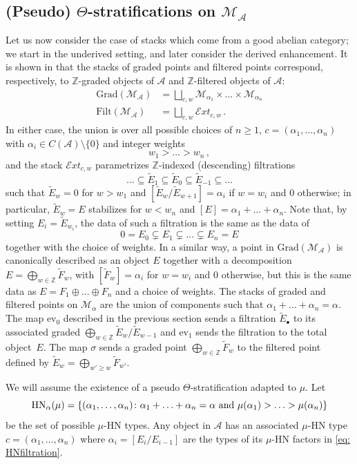 \documentclass[12pt]{amsart}
\theoremstyle{definition}
\newcommand{\BZ}{{\mathbb{Z}}}
\newcommand{\CA}{{\mathcal A}}
\newcommand{\CM}{{\mathcal M}}
\newcommand{\1}{\mathbf 1}
\renewcommand{\ev}{\mathrm{ev}}
\newcommand{\HN}{\mathrm{HN}}
\newcommand{\Grad}{\mathrm{Grad}}
\newcommand{\Filt}{\mathrm{Filt}}
\begin{document}
\subsection{(Pseudo) $\Theta$-stratifications on $\CM_\CA$}\label{subsec: stratificationabelian}
Let us now consider the case of stacks which come from a good abelian category; we start in the underived setting, and later consider the derived enhancement. It is shown in \cite[Proposition 7.12, Corollary 7.13]{AHLH} that the stacks of graded points and filtered points correspond, respectively, to $\BZ$-graded objects of $\CA$ and $\BZ$-filtered objects of $\CA$:
\begin{align}
\label{eq: gradedfiltpoints}    \Grad(\CM_\CA)&=\bigsqcup_{c, w}\CM_{\alpha_1}\times\ldots\times  \CM_{\alpha_n}\\
\nonumber    \Filt(\CM_\CA)&=\bigsqcup_{c, w}\mathcal{E}xt_{c, w}\,.
\end{align}
In either case, the union is over all possible choices of $n\geq 1$, $c=(\alpha_1, \ldots, \alpha_n)$ with $\alpha_i\in C(\CA)\setminus \{0\}$ and integer weights
\[w_1>\ldots>w_n\,,\]
and the stack $\mathcal{E}xt_{c, w}$ parametrizes $\BZ$-indexed (descending) filtrations
\[\ldots \subseteq \tilde E_{1}\subseteq \tilde E_0\subseteq \tilde E_{-1}\subseteq \ldots\]
such that $\tilde E_w=0$ for $w>w_1$ and $[\tilde E_w/\tilde E_{w+1}]=\alpha_i$ if $w=w_i$ and 0 otherwise; in particular, $\tilde E_w=E$ stabilizes for $w<w_n$ and $[E]=\alpha_1+\ldots+\alpha_n$. Note that, by setting $E_i=\tilde E_{w_i}$, the data of such a filtration is the same as the data of 
\[0=E_0\subsetneq E_1\subsetneq \ldots\subsetneq E_n=E\]
together with the choice of weights. In a similar way, a point in  $\Grad(\CM_\CA)$ is canonically described as an object $E$ together with a decomposition $E=\bigoplus_{w\in \BZ} \tilde F_w$, with $[\tilde F_{w}]=\alpha_i$ for $w=w_i$ and $0$ otherwise, but this is the same data as $E=F_1\oplus \ldots \oplus F_n$ and a choice of weights. The stacks of graded and filtered points on $\CM_\alpha$ are the union of components such that $\alpha_1+\ldots+\alpha_n=\alpha$. The map $\ev_0$ described in the previous section sends a filtration $\tilde E_\bullet$ to its associated graded $\bigoplus_{w\in \BZ} \tilde E_w/\tilde E_{w-1}$ and $\ev_1$ sends the filtration to the total object~$E$. The map $\sigma$ sends a graded point $\bigoplus_{w\in \BZ} \tilde F_w$ to the filtered point defined by $\tilde E_w=\bigoplus_{w'\geq w}\tilde F_{w'}$.

We will assume the existence of a pseudo $\Theta$-stratification adapted to $\mu$. Let 
\[\HN_\alpha(\mu)=\{(\alpha_1, \ldots, \alpha_n)\colon \alpha_1+\ldots+\alpha_n=\alpha \textup{ and }\mu(\alpha_1)>\ldots>\mu(\alpha_n)\}\]
be the set of possible $\mu$-HN types. Any object in $\CA$ has an associated $\mu$-HN type $c=(\alpha_1, \ldots, \alpha_n)$ where $\alpha_i=[E_i/E_{i-1}]$ are the types of its $\mu$-HN factors in \eqref{eq: HNfiltration}. 
\end{document}
